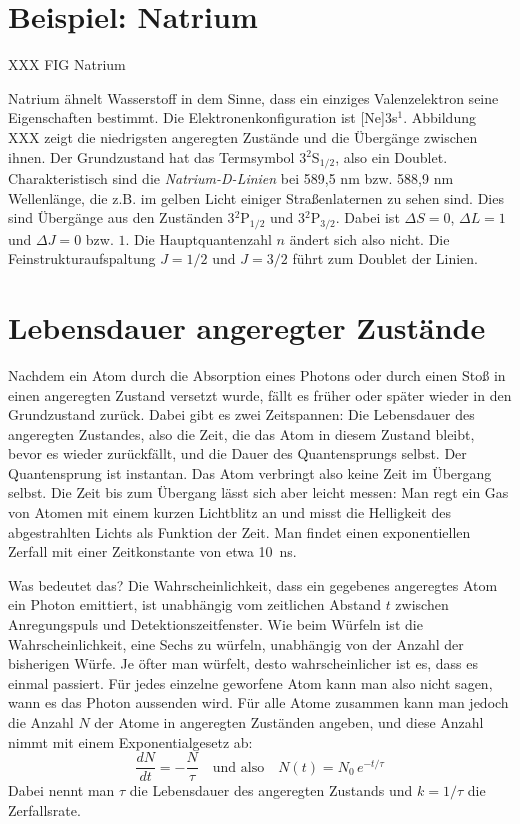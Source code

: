 \section{Beispiel: Natrium}


XXX FIG Natrium


Natrium ähnelt Wasserstoff in dem Sinne, dass ein einziges Valenzelektron seine Eigenschaften bestimmt. Die Elektronenkonfiguration ist [Ne]3s$^1$. Abbildung XXX zeigt die niedrigsten angeregten Zustände und die Übergänge zwischen ihnen. Der Grundzustand hat das Termsymbol 3$^2$S$_{1/2}$, also ein Doublet. Charakteristisch sind die \emph{Natrium-D-Linien} bei 589,5 nm bzw. 588,9 nm Wellenlänge, die z.B. im gelben Licht einiger Straßenlaternen zu sehen sind.
Dies sind Übergänge aus den Zuständen 3$^2$P$_{1/2}$ und 3$^2$P$_{3/2}$. Dabei ist $\Delta S = 0$, $\Delta L = 1$ und $\Delta J = 0$ bzw. $1$. Die Hauptquantenzahl $n$ ändert sich also nicht. Die Feinstrukturaufspaltung $J = 1/2$ und $J=3/2$ führt zum Doublet der Linien.

\section{Lebensdauer angeregter Zustände}

Nachdem ein Atom durch die Absorption eines Photons oder durch einen Stoß in einen angeregten Zustand versetzt wurde, fällt es früher oder später wieder in den Grundzustand zurück. Dabei gibt es zwei Zeitspannen: Die Lebensdauer des angeregten Zustandes, also die Zeit, die das Atom in diesem Zustand bleibt, bevor es wieder zurückfällt, und die Dauer des Quantensprungs selbst. Der Quantensprung ist instantan. Das Atom verbringt also keine Zeit im Übergang selbst. Die Zeit bis zum Übergang lässt sich aber leicht messen: Man regt ein Gas von Atomen mit einem kurzen Lichtblitz an und misst die Helligkeit des abgestrahlten Lichts als Funktion der Zeit. Man findet einen exponentiellen Zerfall mit einer Zeitkonstante von etwa 10~ns.

Was bedeutet das? Die Wahrscheinlichkeit, dass ein gegebenes angeregtes Atom ein Photon emittiert, ist unabhängig vom zeitlichen Abstand $t$ zwischen Anregungspuls und Detektionszeitfenster. Wie beim Würfeln ist die Wahrscheinlichkeit, eine Sechs zu würfeln, unabhängig von der Anzahl der bisherigen Würfe. Je öfter man würfelt, desto wahrscheinlicher ist es, dass es einmal passiert. Für jedes einzelne geworfene Atom kann man also nicht sagen, wann es das Photon aussenden wird. Für alle Atome zusammen kann man jedoch die Anzahl $N$ der Atome in angeregten Zuständen angeben, und diese Anzahl nimmt mit einem Exponentialgesetz ab: 
\begin{equation}
    \frac{d N}{dt} = - \frac{N}{\tau} \quad \text{und also} \quad N(t) = N_0 \, e^{- t / \tau}
\end{equation} 
Dabei nennt man $\tau$ die Lebensdauer des angeregten Zustands und $k = 1 / \tau$ die Zerfallsrate.


